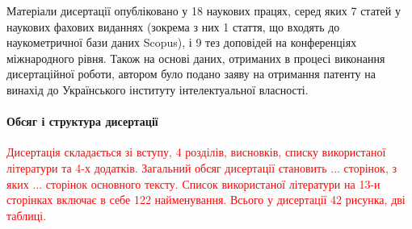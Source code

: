 Матеріали дисертації опубліковано у 18 наукових працях, серед яких 7
статей у наукових фахових виданнях (зокрема з них 1 стаття, що входять до 
наукометричної бази даних Scopus), і 9 тез доповідей на конференціях 
міжнародного рівня. Також на основі даних, отриманих в процесі виконання 
дисертаційної роботи, автором було подано заяву на отримання патенту на 
винахід до Українського інституту інтелектуальної власності.

\paragraph{Обсяг і структура дисертації}

\textcolor{red}{Дисертація складається зі вступу, 4 розділів, висновків, списку використаної 
літератури та 4-х додатків. Загальний обсяг дисертації становить ... сторінок, з 
яких ... сторінок основного тексту. Список використаної літератури на 13-и 
сторінках включає в себе 122 найменування. Всього у дисертації 42 рисунка, 
дві таблиці.}








